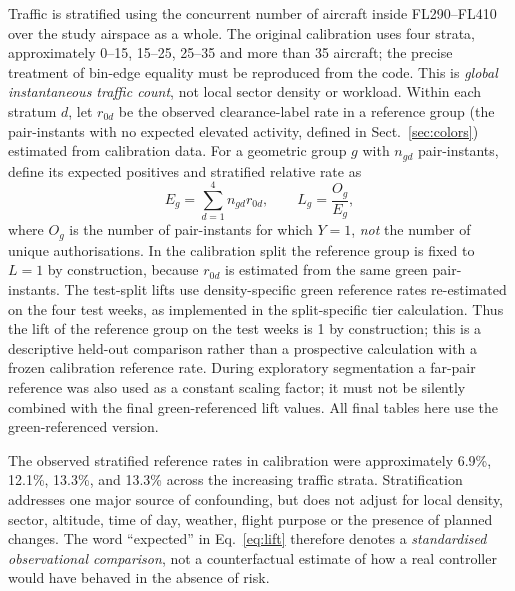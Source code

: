 \documentclass[pdflatex,sn-mathphys-num]{sn-jnl}
\begin{document}
Traffic is stratified using the concurrent number of aircraft inside FL290--FL410 over the study airspace as a whole. The original calibration uses four strata, approximately 0--15, 15--25, 25--35 and more than 35 aircraft; the precise treatment of bin-edge equality must be reproduced from the code. This is \emph{global instantaneous traffic count}, not local sector density or workload. Within each stratum $d$, let $r_{0d}$ be the observed clearance-label rate in a reference group (the pair-instants with no expected elevated activity, defined in Sect.~\ref{sec:colors}) estimated from calibration data. For a geometric group $g$ with $n_{gd}$ pair-instants, define its expected positives and stratified relative rate as
\begin{equation}\label{eq:lift}
 E_g=\sum_{d=1}^{4}n_{gd}r_{0d},\qquad L_g=\frac{O_g}{E_g},
\end{equation}
where $O_g$ is the number of pair-instants for which $Y=1$, \emph{not} the number of unique authorisations. In the calibration split the reference group is fixed to $L=1$ by construction, because $r_{0d}$ is estimated from the same green pair-instants. The test-split lifts use density-specific green reference rates re-estimated on the four test weeks, as implemented in the split-specific tier calculation. Thus the lift of the reference group on the test weeks is 1 by construction; this is a descriptive held-out comparison rather than a prospective calculation with a frozen calibration reference rate. During exploratory segmentation a far-pair reference was also used as a constant scaling factor; it must not be silently combined with the final green-referenced lift values. All final tables here use the green-referenced version.

The observed stratified reference rates in calibration were approximately 6.9\%, 12.1\%, 13.3\%, and 13.3\% across the increasing traffic strata. Stratification addresses one major source of confounding, but does not adjust for local density, sector, altitude, time of day, weather, flight purpose or the presence of planned changes. The word ``expected'' in Eq.~\eqref{eq:lift} therefore denotes a \emph{standardised observational comparison}, not a counterfactual estimate of how a real controller would have behaved in the absence of risk.
\end{document}
